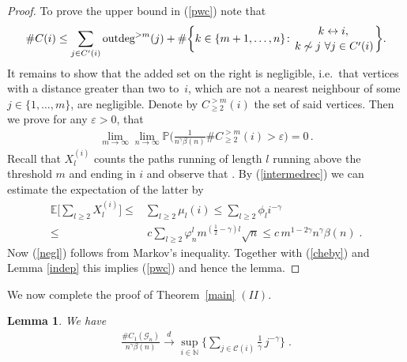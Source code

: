 \documentclass[12pt,a4paper]{article}
\numberwithin{equation}{section}
\newtheorem{lemma}[shared]{Lemma}
\begin{document}
\begin{proof}
To prove the upper bound in (\ref{pwc}) note that
\begin{align}\label{cle}
   \# C(i) \leq \sum_{j\in C'(i)} \text{outdeg}^{>m}(j) + \# \bigg\{ k\in\{m+1,\ldots,n\} \colon {k \leftrightarrow i, \,\atop k \not\sim j \,\,\forall j\in C'(i)} \bigg\}. 
\end{align}
It remains to show that the added set on the right is negligible, i.e.\ that
vertices with a distance greater than two 
to~$i$, which are not a nearest neighbour of some $j\in\{1,\dots,m\}$, are negligible. Denote by $C^{>m}_{\ge2}(i)$ the set of said vertices. Then we prove for any $\varepsilon>0$, that
\begin{align} \label{negl}
   \lim_{m\to \infty} \lim_{n\to \infty} \mathbb{P}\Big(\frac{1}{n^\gamma\beta(n)}\#C^{>m}_{\ge 2}(i) > \varepsilon \Big) =0 \,.
\end{align}
Recall that $X^{(i)}_l$ counts the paths running of length $l$ running above the threshold $m$ and ending in $i$ and observe that . By (\ref{intermedrec}) we can estimate the expectation of the latter by 
\begin{align*}
    \mathbb{E}\Big[\sum_{l\ge2} X^{(i)}_l\Big] \le &  \sum_{l\ge2} \mu_l(i) \le  \sum_{l\ge2}  \phi_l i^{-\gamma} 
    \\ \le & \,c \sum_{l\ge2} \varphi_n^l m^{(\tfrac12-\gamma)l} \sqrt{n} \le c \,m^{1-2\gamma} n^{\gamma} \beta(n) \;.
\end{align*}
Now (\ref{negl}) follows from Markov's inequality. Together with
(\ref{cheby})  and Lemma \ref{indep} this implies (\ref{pwc}) and hence the lemma.
\end{proof}

\noindent We now complete the proof of Theorem~\ref{main} $(I\!I)$.

\begin{lemma}\label{conclusion}
    We have
    \begin{align*}
    \frac{\# C_1(\mathscr{G}_n)}{n^\gamma \beta(n)}  \overset{d}{\longrightarrow} \sup_{i\in\mathbb N}\bigg\{\sum_{j\in\mathcal C(i)} \frac{1}{\gamma}\, j^{-\gamma}\bigg\}\;.
\end{align*}
\end{lemma}
\end{document}
